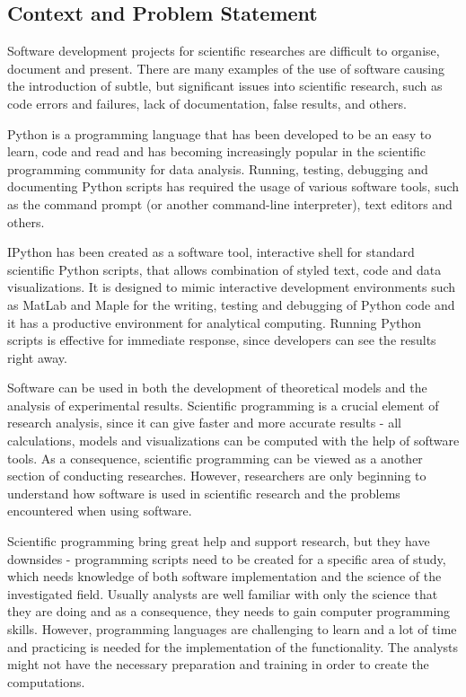 \subsection{Context and Problem Statement}
\label{subsec:problem}

Software development projects for scientific researches are difficult to organise, document and present. There are many examples of the use of software causing the introduction of subtle, but significant issues into scientific research, such as code errors and failures, lack of documentation, false results, and others. 

Python is a programming language that has been developed to be an easy to learn, code and read and has becoming increasingly popular in the scientific programming community for data analysis. Running, testing, debugging and documenting Python scripts has required the usage of various software tools, such as the command prompt (or another command-line interpreter), text editors and others. 

IPython has been created as a software tool, interactive shell for standard scientific Python scripts, that allows combination of styled text, code and data visualizations.\cite{mckinney2012python} It is designed to mimic interactive development environments such as MatLab \cite{matLab} and Maple \cite{maple} for  the writing, testing and debugging of Python code and it has a productive environment for analytical computing. \cite{mckinney2012python} Running Python scripts is effective for immediate response, since developers can see the results right away.

Software can be used in both the development of theoretical models and the analysis of experimental results. Scientific programming is a crucial element of research analysis, since it can give faster and more accurate results - all calculations, models and visualizations can be computed with the help of software tools. As a consequence, scientific programming can be viewed as a another section of conducting researches.\cite{johansson2014introduction} However, researchers are only beginning to understand how software is used in scientific research and the problems encountered when using software.

Scientific programming bring great help and support research, but they have downsides - programming scripts need to be created for a specific area of study, which needs knowledge of both software implementation and the science of the investigated field. Usually analysts are well familiar with only the science that they are doing and as a consequence, they needs to gain computer programming skills. However, programming languages are challenging to learn and a lot of time and practicing is needed for the implementation of the functionality. The analysts might not have the necessary preparation and training in order to create the computations.  

